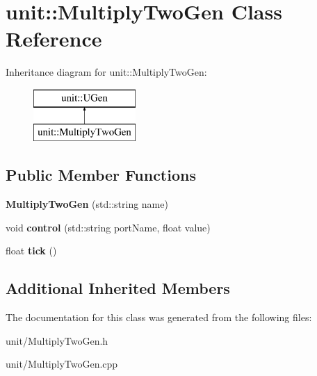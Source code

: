 \hypertarget{classunit_1_1MultiplyTwoGen}{}\section{unit\+:\+:Multiply\+Two\+Gen Class Reference}
\label{classunit_1_1MultiplyTwoGen}
Inheritance diagram for unit\+:\+:Multiply\+Two\+Gen\+:\begin{figure}[H]
\begin{center}
\leavevmode
\includegraphics[height=2.000000cm]{classunit_1_1MultiplyTwoGen}
\end{center}
\end{figure}
\subsection*{Public Member Functions}
\begin{DoxyCompactItemize}
\item 
{\bfseries Multiply\+Two\+Gen} (std\+::string name)\hypertarget{classunit_1_1MultiplyTwoGen_a35e526170e8ac7a43fc19c2a78e14b44}{}\label{classunit_1_1MultiplyTwoGen_a35e526170e8ac7a43fc19c2a78e14b44}

\item 
void {\bfseries control} (std\+::string port\+Name, float value)\hypertarget{classunit_1_1MultiplyTwoGen_af8558651a63c73f27221e99ad03f3242}{}\label{classunit_1_1MultiplyTwoGen_af8558651a63c73f27221e99ad03f3242}

\item 
float {\bfseries tick} ()\hypertarget{classunit_1_1MultiplyTwoGen_a70a07ad9e0f67e6a50aadcdf902db8f3}{}\label{classunit_1_1MultiplyTwoGen_a70a07ad9e0f67e6a50aadcdf902db8f3}

\end{DoxyCompactItemize}
\subsection*{Additional Inherited Members}


The documentation for this class was generated from the following files\+:\begin{DoxyCompactItemize}
\item 
unit/Multiply\+Two\+Gen.\+h\item 
unit/Multiply\+Two\+Gen.\+cpp\end{DoxyCompactItemize}

